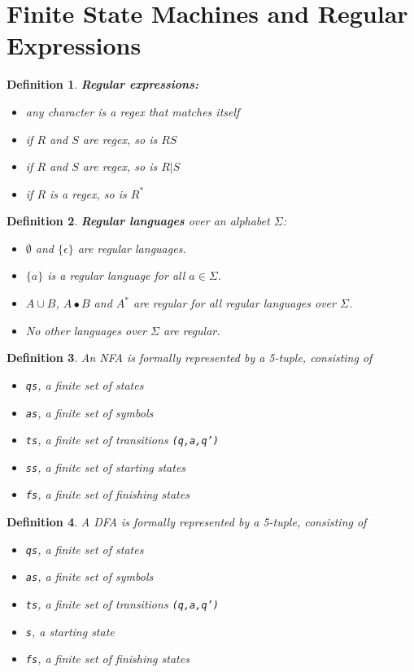 \documentclass{article}
\theoremstyle{sltheorem}
\newtheorem{definition}{Definition}
\begin{document}
\section{Finite State Machines and Regular Expressions}
\begin{definition}
	\textbf{Regular expressions:}
	\begin{itemize}
		\item any character is a regex that matches itself
		\item if $R$ and $S$ are regex, so is $RS$
		\item if $R$ and $S$ are regex, so is $R|S$
		\item if $R$ is a regex, so is $R^*$
	\end{itemize}
\end{definition}
\begin{definition}
	\textbf{Regular languages} over an alphabet $\Sigma$:
	\begin{itemize}
		\item $\emptyset$ and $\{\epsilon\}$ are regular languages.
		\item $\{a\}$ is a regular language for all $a\in\Sigma$.
		\item $A\cup B$, $A\bullet B$ and $A^*$ are regular for all regular languages over $\Sigma$.
		\item No other languages over $\Sigma$ are regular.
	\end{itemize}
\end{definition}
\begin{definition}
	An NFA is formally represented by a 5-tuple, consisting of
	\begin{itemize}
		\item \texttt{qs}, a finite set of states
		\item \texttt{as}, a finite set of symbols
		\item \texttt{ts}, a finite set of transitions \texttt{(q,a,q')}
		\item \texttt{ss}, a finite set of starting states
		\item \texttt{fs}, a finite set of finishing states
	\end{itemize}
\end{definition}
\begin{definition}
	A DFA is formally represented by a 5-tuple, consisting of
	\begin{itemize}
		\item \texttt{qs}, a finite set of states
		\item \texttt{as}, a finite set of symbols
		\item \texttt{ts}, a finite set of transitions \texttt{(q,a,q')}
		\item \texttt{s}, a starting state
		\item \texttt{fs}, a finite set of finishing states
	\end{itemize}
\end{definition}
\end{document}

